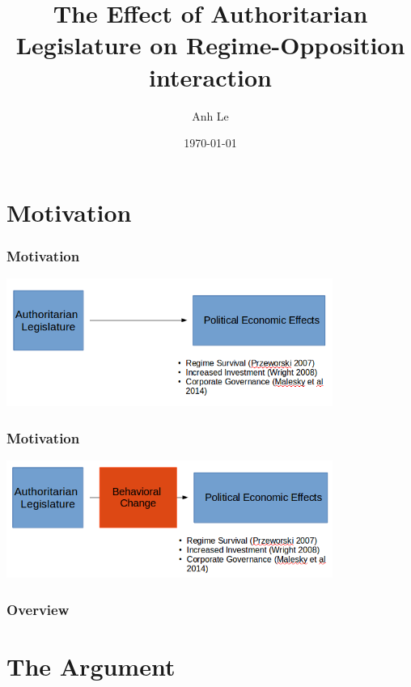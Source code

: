 \documentclass{beamer}
\title[Effect of Authoritarian Legislature]{The Effect of Authoritarian Legislature on Regime-Opposition interaction} %
\author{Anh Le} %
\institute[Duke] %
{Duke University \\ %
\medskip
\textit{anh.le@duke.edu} %
}
\date{\today} %
\begin{document}

\begin{frame}
\titlepage %
\end{frame}

\section{Motivation}
\begin{frame}
\frametitle{Motivation}
\centering
\includegraphics[width=0.8\textwidth]{legislature_to_pe}
\end{frame}

\begin{frame}
\frametitle{Motivation}
\centering
\includegraphics[width=0.8\textwidth]{legislature_to_behavior}
\end{frame}

\begin{frame}
\frametitle{Overview}
\tableofcontents
\end{frame}


\section{The Argument}
\end{document}
